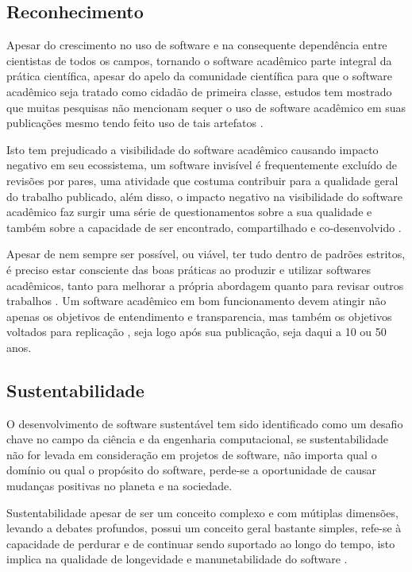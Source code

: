 \subsection{Reconhecimento}


Apesar do crescimento no uso de software e na consequente dependência entre
cientistas de todos os campos, tornando o software acadêmico parte integral da
prática científica, apesar do apelo da comunidade científica para que o
software acadêmico seja tratado como cidadão de primeira classe, estudos tem
mostrado que muitas pesquisas não mencionam sequer o uso de software acadêmico
em suas publicações mesmo tendo feito uso de tais artefatos
\cite{momcheva2015software} \cite{howison2016software}.

Isto tem prejudicado a visibilidade do software acadêmico causando impacto
negativo em seu ecossistema, um software invisível é frequentemente excluído de
revisões por pares, uma atividade que costuma contribuir para a qualidade geral
do trabalho publicado, além disso, o
impacto negativo na visibilidade do software acadêmico faz surgir uma
série de questionamentos sobre a sua qualidade e também sobre a
capacidade de ser encontrado, compartilhado e co-desenvolvido
\cite{howison2013, katz2014transitive} \cite{howison2016software}.

Apesar de nem sempre ser possível, ou viável, ter tudo dentro de padrões
estritos, é preciso estar consciente das boas práticas ao produzir e utilizar
softwares acadêmicos, tanto para melhorar a própria abordagem quanto para
revisar outros trabalhos \cite{wilson2014best}. Um software acadêmico em bom
funcionamento devem atingir não apenas os objetivos de entendimento e
transparencia, mas também os objetivos voltados para replicação
\cite{Stodden2010}, seja logo após sua publicação, seja daqui a 10 ou 50 anos.

\subsection{Sustentabilidade}

O desenvolvimento de software sustentável tem sido identificado como um desafio
chave no campo da ciência e da engenharia computacional, se sustentabilidade
não for levada em consideração em projetos de software, não importa qual o
domínio ou qual o propósito do software, perde-se a oportunidade de causar
mudanças positivas no planeta e na sociedade.

Sustentabilidade apesar de ser um conceito complexo e com mútiplas dimensões,
levando a debates profundos, possui um conceito geral bastante simples, refe-se à
capacidade de perdurar e de continuar sendo suportado ao longo do tempo, isto
implica na qualidade de longevidade e manunetabilidade do software
\cite{venters2014software}.

